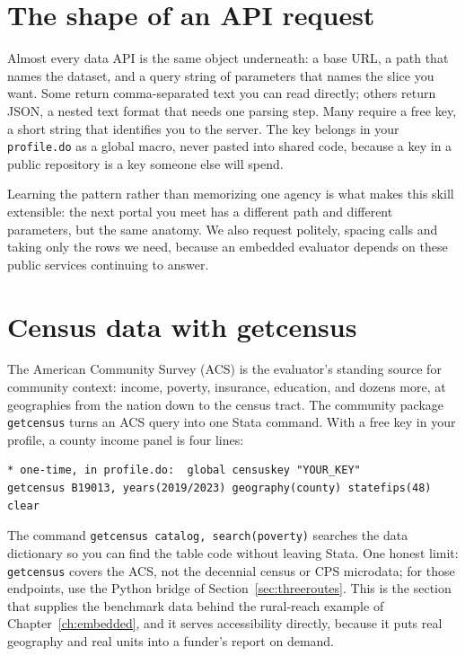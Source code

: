 \documentclass[
    a4paper,
    fontsize=10pt,
    twoside=true,
    numbers=noenddot,
]{kaobook}
\begin{document}
\section{The shape of an API request}
Almost every data API is the same object underneath: a base URL, a path that names the dataset, and a query string of parameters that names the slice you want. Some return comma-separated text you can read directly; others return JSON, a nested text format that needs one parsing step. Many require a free key, a short string that identifies you to the server. The key belongs in your \texttt{profile.do} as a global macro, never pasted into shared code, because a key in a public repository is a key someone else will spend.

Learning the pattern rather than memorizing one agency is what makes this skill extensible: the next portal you meet has a different path and different parameters, but the same anatomy. We also request politely, spacing calls and taking only the rows we need, because an embedded evaluator depends on these public services continuing to answer.

\section{Census data with getcensus}
The American Community Survey (ACS) is the evaluator's standing source for community context: income, poverty, insurance, education, and dozens more, at geographies from the nation down to the census tract. The community package \texttt{getcensus} turns an ACS query into one Stata command. With a free key in your profile, a county income panel is four lines:
{\footnotesize
\begin{verbatim}
* one-time, in profile.do:  global censuskey "YOUR_KEY"
getcensus B19013, years(2019/2023) geography(county) statefips(48) clear
\end{verbatim}
}
The command \texttt{getcensus catalog, search(poverty)} searches the data dictionary so you can find the table code without leaving Stata. One honest limit: \texttt{getcensus} covers the ACS, not the decennial census or CPS microdata; for those endpoints, use the Python bridge of Section~\ref{sec:threeroutes}. This is the section that supplies the benchmark data behind the rural-reach example of Chapter~\ref{ch:embedded}, and it serves accessibility directly, because it puts real geography and real units into a funder's report on demand.
\end{document}
